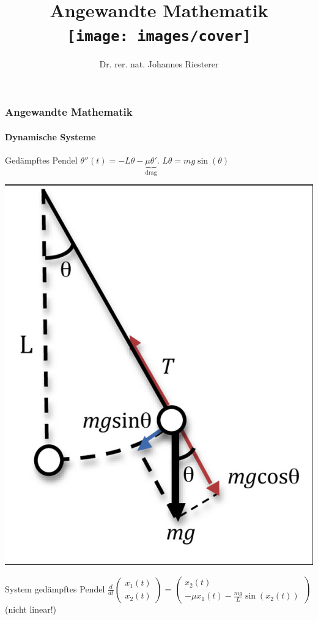 \documentclass{beamer}
\begin{document}
\title[Angewandte Mathematik] %
{Angewandte Mathematik
\\
\texttt{[image: images/cover]}
}
\subtitle{}
\author[Dr. Johannes Riesterer] %
{Dr.  rer. nat. Johannes Riesterer}

\date[KPT 2004] %
{}

\subject{Angewandte Mathematik}



\frame{\titlepage}



\begin{frame}
    \frametitle{Angewandte Mathematik}
\framesubtitle{Dynamische Systeme }
\begin{block}{Gedämpftes Pendel}
$\theta''(t) = -L \theta - \underbrace{\mu \theta'}_{\text{drag}}$. $L \theta = mg \sin(\theta)$ 
\end{block}
\includegraphics[scale=0.2]{images/pendulum0}
\begin{block}{System gedämpftes Pendel}
    $ \frac{d}{dt}\begin{pmatrix}
        x_1(t) \\ x_2(t)
    \end{pmatrix} = 
    \begin{pmatrix}
        x_2(t) \\ -\mu x_1(t) - \frac{m g}{L} \sin(x_2(t))  
    \end{pmatrix} $ (nicht linear!)
    \end{block}
 \end{frame}
\end{document}

